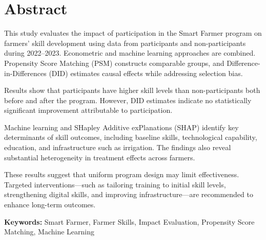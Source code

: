 \chapter*{Abstract}

This study evaluates the impact of participation in the Smart Farmer program on farmers’ skill development using data from participants and non-participants during 2022–2023. Econometric and machine learning approaches are combined. Propensity Score Matching (PSM) constructs comparable groups, and Difference-in-Differences (DID) estimates causal effects while addressing selection bias.

Results show that participants have higher skill levels than non-participants both before and after the program. However, DID estimates indicate no statistically significant improvement attributable to participation.

Machine learning and SHapley Additive exPlanations (SHAP) identify key determinants of skill outcomes, including baseline skills, technological capability, education, and infrastructure such as irrigation. The findings also reveal substantial heterogeneity in treatment effects across farmers.

These results suggest that uniform program design may limit effectiveness. Targeted interventions—such as tailoring training to initial skill levels, strengthening digital skills, and improving infrastructure—are recommended to enhance long-term outcomes.

\vspace{0.5cm}
\textbf{Keywords:} Smart Farmer, Farmer Skills, Impact Evaluation, Propensity Score Matching, Machine Learning